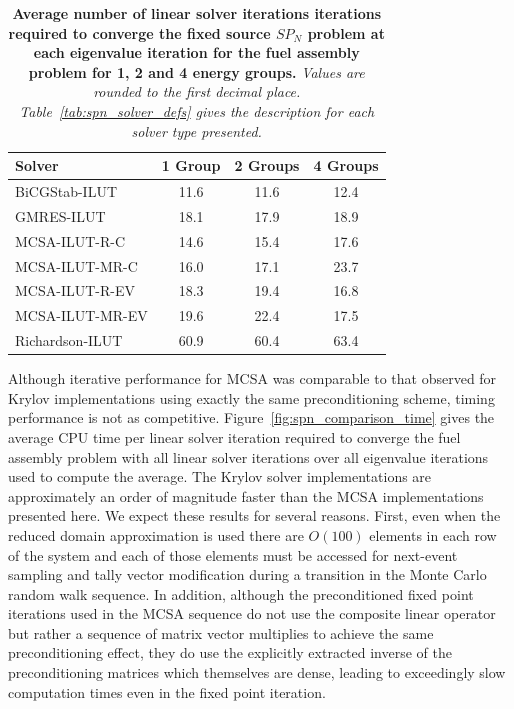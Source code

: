 \documentclass[letterpaper,12pt]{article}
\begin{document}
\begin{table}[h!]
  \begin{center}
    \begin{tabular}{lccc}\hline\hline
      \multicolumn{1}{l}{Solver}&
      \multicolumn{1}{c}{1 Group}&
      \multicolumn{1}{c}{2 Groups}&
      \multicolumn{1}{c}{4 Groups}\\
      \hline
      BiCGStab-ILUT & 11.6 & 11.6 & 12.4 \\ 
      GMRES-ILUT & 18.1 & 17.9 & 18.9 \\
      MCSA-ILUT-R-C & 14.6 & 15.4 & 17.6 \\
      MCSA-ILUT-MR-C & 16.0 & 17.1 & 23.7 \\
      MCSA-ILUT-R-EV & 18.3 & 19.4 & 16.8 \\
      MCSA-ILUT-MR-EV & 19.6 & 22.4 & 17.5 \\
      Richardson-ILUT & 60.9 & 60.4 & 63.4 \\
      \hline\hline
    \end{tabular}
  \end{center}
  \caption{\textbf{Average number of linear solver iterations
      iterations required to converge the fixed source $SP_N$ problem
      at each eigenvalue iteration for the fuel assembly problem for
      1, 2 and 4 energy groups.} \textit{Values are rounded to the
      first decimal place. Table~\ref{tab:spn_solver_defs} gives the
      description for each solver type presented.}}
  \label{tab:spn_comparison_iterations}
\end{table}

Although iterative performance for MCSA was comparable to that
observed for Krylov implementations using exactly the same
preconditioning scheme, timing performance is not as
competitive. Figure~\ref{fig:spn_comparison_time} gives the average
CPU time per linear solver iteration required to converge the fuel
assembly problem with all linear solver iterations over all eigenvalue
iterations used to compute the average. The Krylov solver
implementations are approximately an order of magnitude faster than
the MCSA implementations presented here. We expect these results for
several reasons. First, even when the reduced domain approximation is
used there are $O(100)$ elements in each row of the system and each of
those elements must be accessed for next-event sampling and tally
vector modification during a transition in the Monte Carlo random walk
sequence. In addition, although the preconditioned fixed point
iterations used in the MCSA sequence do not use the composite linear
operator but rather a sequence of matrix vector multiplies to achieve
the same preconditioning effect, they do use the explicitly extracted
inverse of the preconditioning matrices which themselves are dense,
leading to exceedingly slow computation times even in the fixed point
iteration.
\end{document}
